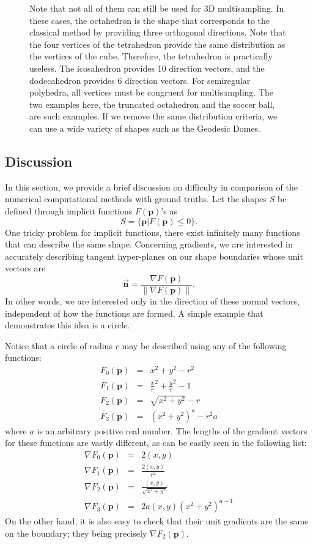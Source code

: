 \documentclass{article}
\begin{document}
\begin{figure}
{        Note that not all of them can still be used for 3D multisampling. In these cases, the octahedron is the shape that corresponds to the classical method by providing three orthogonal directions. Note that the four vertices of the tetrahedron provide the same distribution as the vertices of the cube. Therefore, the tetrahedron is practically useless. The icosahedron provides 10 direction vectors, and the dodecahedron provides 6 direction vectors. For semiregular polyhedra, all vertices must be congruent for multisampling. The two examples here, the truncated octahedron and the soccer ball, are such examples. If we remove the same distribution criteria, we can use a wide variety of shapes such as the Geodesic Domes.   }
        \label{fig_regularpolyhedron}
\end{figure}

\subsection{Discussion}

In this section, we provide a brief discussion on difficulty in comparison of the numerical computational methods with ground truths.  Let the shapes $S$ be defined through implicit functions $F(\mathbf{p})$'s as 
$$S = \{\mathbf{p} | F( \mathbf{p} ) \leq 0 \} . $$
One tricky problem for implicit functions, there exist infinitely many functions that can describe the same shape. Concerning gradients, we are interested in accurately describing tangent hyper-planes on our shape boundaries whose unit vectors are 
$$\vec{\mathbf{n}} = \frac{\nabla F( \mathbf{p} )}{\|\nabla F(\mathbf{p})\|}.$$
In other words, we are interested only in the direction of these normal vectors, independent of how the functions are formed. A simple example that demonstrates this idea is a circle. 

Notice that a circle of radius $r$ may be described using any of the following functions: 
\begin{eqnarray}
F_0(\mathbf{p}) &=& x^2 + y^2 - r^2 \nonumber \\
F_1(\mathbf{p}) &=& \frac{x}{r}^2 +  \frac{y}{r}^2 - 1 \nonumber \\
F_2(\mathbf{p}) &=& \sqrt{x^2 + y^2} - r \nonumber \\
F_3(\mathbf{p}) &=& (x^2 + y^2)^a- r^2a \nonumber 
\end{eqnarray}
where $a$ is an arbitrary positive real number. The lengths of the gradient vectors for these functions are vastly different, as can be easily seen in the following list: 
\begin{eqnarray}
\nabla F_0(\mathbf{p}) &=& 2 (x,y) \nonumber \\
\nabla F_1(\mathbf{p}) &=& \frac{2 (x, y) }{r^2} \nonumber \\
\nabla F_2(\mathbf{p}) &=& \frac{(x , y)}{\sqrt{x^2 + y^2}} \nonumber \\
\nabla F_3(\mathbf{p}) &=& 2a (x , y ) (x^2 + y^2)^{a-1} \nonumber
\end{eqnarray}
On the other hand, it is also easy to check that their unit gradients are the same on the boundary; they being precisely $\nabla F_2(\mathbf{p})$. 
\end{document}
